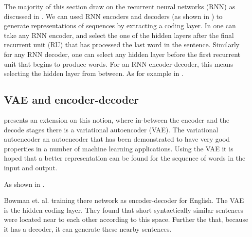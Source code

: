 \documentclass[12pt,parskip]{komatufte}
\begin{document}
The majority of this section draw on the recurrent neural networks (RNN) as discussed in .
We can used RNN encoders and decoders (as shown in ) to generate representations of sequences by extracting a coding layer.
In one can take any RNN encoder,
and select the one of the hidden layers after the final recurrent unit (RU) that has processed the last word in the sentence.
Similarly for any RNN decoder, one can select any hidden layer before the first recurrent unit that begins to produce words.
For an RNN encoder-decoder, this means selecting the hidden layer from between.
As for example in .

\subsection{VAE and encoder-decoder}
 presents an extension on this notion,
where in-between the encoder and the decode stages there is a variational autoencoder (VAE).
The variational autoencoder  an autoencoder that has been demonstrated to have very good properties in a number of machine learning applications.
Using the VAE it is hoped that a better representation can be found for the sequence of words in the input and output.

As shown in .

Bowman et. al. training there network as encoder-decoder for English.
The VAE is the hidden coding layer. 
They found that short syntactically similar sentences were located near to each other according to this space.
Further the that, because it has a decoder, it can generate these nearby sentences.
\end{document}
